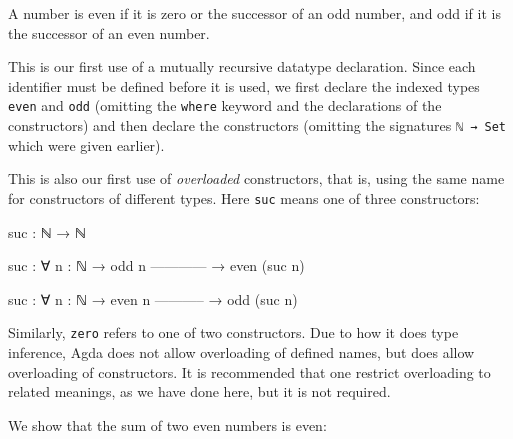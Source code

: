 A number is even if it is zero or the successor of an odd number, and
odd if it is the successor of an even number.

This is our first use of a mutually recursive datatype declaration.
Since each identifier must be defined before it is used, we first
declare the indexed types \texttt{even} and \texttt{odd} (omitting the
\texttt{where} keyword and the declarations of the constructors) and
then declare the constructors (omitting the signatures
\texttt{ℕ\ →\ Set} which were given earlier).

This is also our first use of \emph{overloaded} constructors, that is,
using the same name for constructors of different types. Here
\texttt{suc} means one of three constructors:

\begin{myDisplay}
suc : ℕ → ℕ

suc : ∀ {n : ℕ}
  → odd n
    ------------
  → even (suc n)

suc : ∀ {n : ℕ}
  → even n
    -----------
  → odd (suc n)
\end{myDisplay}

Similarly, \texttt{zero} refers to one of two constructors. Due to how
it does type inference, Agda does not allow overloading of defined
names, but does allow overloading of constructors. It is recommended
that one restrict overloading to related meanings, as we have done here,
but it is not required.

We show that the sum of two even numbers is even:

